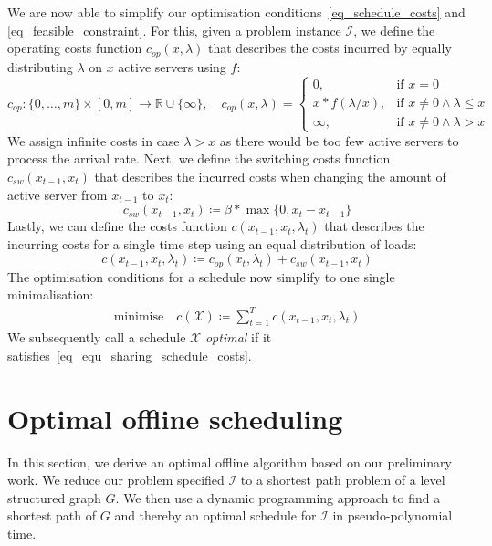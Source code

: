\documentclass[hidelinks]{article}
\theoremstyle{plain}
\theoremstyle{definition}
\theoremstyle{rem}
\newcommand{\mx}{\mathcal{X}}
\newcommand{\inp}{\mathcal{I}}
\newcommand{\costs}{c}
\newcommand{\opcosts}{c_{op}}
\newcommand{\swcosts}{c_{sw}}
\newcommand{\fromto}[2]{\{#1,\ldots,#2\}}
\begin{document}
We are now able to simplify our optimisation conditions~\eqref{eq_schedule_costs} and \eqref{eq_feasible_constraint}. 
For this, given a problem instance $\inp$, we define the operating costs function $\opcosts(x,\lambda)$ that describes the costs incurred by equally distributing $\lambda$ on $x$ active servers using $f$:
\begin{equation*}
	\opcosts:\fromto{0}{m}\times[0,m]\rightarrow\mathbb{R}\cup\{\infty\},\quad \opcosts(x,\lambda)=\begin{cases}
          0, & \text{if $x=0$}\\
	  x*f(\lambda/x), & \text{if $x\ne 0\land\lambda\le x$}\\
	  \infty, & \text{if $x\ne 0\land\lambda>x$}
	  \end{cases} \label{fct:c}
\end{equation*}
We assign infinite costs in case $\lambda>x$ as there would be too few active servers to process the arrival rate. Next, we define the switching costs function $\swcosts(x_{t-1},x_t)$ that describes the incurred costs when changing the amount of active server from $x_{t-1}$ to $x_t$:
\begin{equation*}
	\swcosts(x_{t-1},x_t)\coloneqq\beta*\max\{0,x_t-x_{t-1}\}
\end{equation*}
Lastly, we can define the costs function $\costs(x_{t-1},x_t,\lambda_t)$ that describes the incurring costs for a single time step using an equal distribution of loads:
\begin{equation*}
	\costs(x_{t-1},x_{t},\lambda_t)\coloneqq\opcosts(x_t,\lambda_t)+\swcosts(x_{t-1},x_t)
\end{equation*}
The optimisation conditions for a schedule now simplify to one single minimalisation:
\begin{align}
	\text{minimise}\quad \costs(\mx)\coloneqq\sum\limits_{t=1}^{T}\costs(x_{t-1},x_{t},\lambda_t)\label{eq_equ_sharing_schedule_costs}
\end{align}
We subsequently call a schedule $\mx$ \textit{optimal} if it satisfies~\eqref{eq_equ_sharing_schedule_costs}.

\section{Optimal offline scheduling}\label{sec:opt}
In this section, we derive an optimal offline algorithm based on our preliminary work. We reduce our problem specified $\inp$ to a shortest path problem of a level structured graph $G$. We then use a dynamic programming approach to find a shortest path of $G$ and thereby an optimal schedule for $\inp$ in pseudo-polynomial time.
\end{document}
